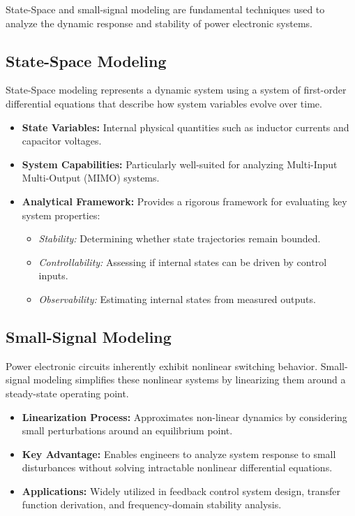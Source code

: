 \documentclass[12pt,a4paper]{article}
\begin{document}
State-Space and small-signal modeling are fundamental techniques used to analyze the dynamic response and stability of power electronic systems.

\subsection{State-Space Modeling}
State-Space modeling represents a dynamic system using a system of first-order differential equations that describe how system variables evolve over time.
\begin{itemize}
    \item \textbf{State Variables:} Internal physical quantities such as inductor currents and capacitor voltages.
    \item \textbf{System Capabilities:} Particularly well-suited for analyzing Multi-Input Multi-Output (MIMO) systems.
    \item \textbf{Analytical Framework:} Provides a rigorous framework for evaluating key system properties:
    \begin{itemize}
        \item \textit{Stability:} Determining whether state trajectories remain bounded.
        \item \textit{Controllability:} Assessing if internal states can be driven by control inputs.
        \item \textit{Observability:} Estimating internal states from measured outputs.
    \end{itemize}
\end{itemize}

\subsection{Small-Signal Modeling}
Power electronic circuits inherently exhibit nonlinear switching behavior. Small-signal modeling simplifies these nonlinear systems by linearizing them around a steady-state operating point.
\begin{itemize}
    \item \textbf{Linearization Process:} Approximates non-linear dynamics by considering small perturbations around an equilibrium point.
    \item \textbf{Key Advantage:} Enables engineers to analyze system response to small disturbances without solving intractable nonlinear differential equations.
    \item \textbf{Applications:} Widely utilized in feedback control system design, transfer function derivation, and frequency-domain stability analysis.
\end{itemize}
\end{document}
